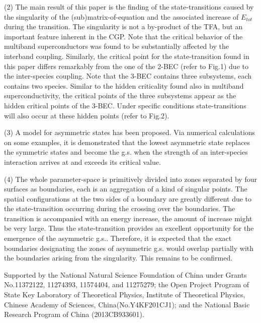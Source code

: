\documentclass[single-column,showpacs,groupedaddress]{revtex4}
\begin{document}
(2) The main result of this paper is the finding of the state-transitions
caused by the singularity of the (sub)matrix-of-equation and the associated
increase of $E_{tot}$ during the transition. The singularity is not a
by-product of the TFA, but an important feature inherent in the CGP. Note
that the critical behavior of the multiband superconductors was found to be
substantially affected by the interband coupling\cite{s1,s2,s3}. Similarly, the
critical point for the state-transition found in this paper differs
remarkably from the one of the 2-BEC (refer to Fig.1) due to the
inter-species coupling. Note that the 3-BEC contains three subsystems, each
contains two species. Similar to the hidden criticality found also in
multiband superconductivity\cite{s2}, the critical points of the three
subsystems appear as the hidden critical points of the 3-BEC. Under specific
conditions state-transitions will also occur at these hidden points (refer
to Fig.2).

(3) A model for asymmetric states has been proposed. Via numerical
calculations on some examples, it is demonstrated that the lowest asymmetric
state replaces the symmetric states and become the g.s. when the strength of
an inter-species interaction arrives at and exceeds its critical value.

(4) The whole parameter-space is primitively divided into zones separated by
four surfaces as boundaries, each is an aggregation of a kind of singular
points. The spatial configurations at the two sides of a boundary are
greatly different due to the state-transition occurring during the crossing
over the boundaries. The transition is accompanied with an energy increase,
the amount of increase might be very large. Thus the state-transition
provides an excellent opportunity for the emergence of the asymmetric g.s..
Therefore, it is expected that the exact boundaries designating the zones of
asymmetric g.s. would overlap partially with the boundaries arising from the
singularity. This remains to be confirmed.

\bigskip

\begin{acknowledgments}
Supported by the National Natural Science Foundation of China under Grants
No.11372122, 11274393, 11574404, and 11275279; the Open Project Program of
State Key Laboratory of Theoretical Physics, Institute of Theoretical
Physics, Chinese Academy of Sciences, China(No.Y4KF201CJ1); and the National
Basic Research Program of China (2013CB933601).
\end{acknowledgments}
\end{document}
